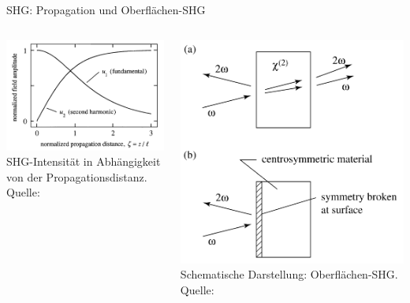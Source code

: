 \documentclass[aspectratio=169]{beamer} %
\newcommand{\figcite}[1]{\\[-3mm]{\tiny Quelle: \cite{#1}}}
\begin{document}
\begin{frame}[noframenumbering]{SHG: Propagation und Oberflächen-SHG}
  \begin{columns}[T,onlytextwidth]
      \centering
      \includegraphics[height=0.28\textheight]{Images/propagation distance.png}\\
      {\tiny SHG-Intensität in Abhängigkeit von der Propagationsdistanz. \figcite{Boyd2020}}
      \vspace{0.4cm}

      \includegraphics[height=0.46\textheight]{Images/surface-shg.png}\\
      {\tiny Schematische Darstellung: Oberflächen-SHG. \figcite{Boyd2020}}


\end{columns}
\end{frame}
\end{document}
